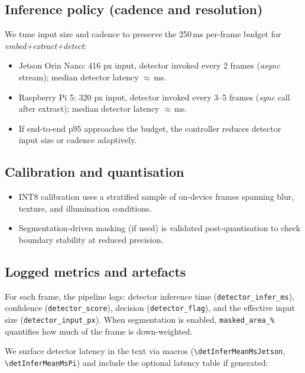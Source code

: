 \subsection{Inference policy (cadence and resolution)}
\label{sec:validation:yolov8n-policy}
We tune input size and cadence to preserve the 250\,ms per-frame budget for \emph{embed+extract+detect}:
\begin{itemize}
  \item Jetson Orin Nano: \(416\) px input, detector invoked every 2 frames (\emph{async} stream); median detector latency \(\approx\)\detInferMeanMsJetson\,ms.
  \item Raspberry Pi 5: \(320\) px input, detector invoked every 3–5 frames (\emph{sync} call after extract); median detector latency \(\approx\)\detInferMeanMsPi\,ms.
  \item If end-to-end p95 approaches the budget, the controller reduces detector input size or cadence adaptively.
\end{itemize}

\subsection{Calibration and quantisation}
\label{sec:validation:yolov8n-quant}
\begin{itemize}
  \item INT8 calibration uses a stratified sample of on-device frames spanning blur, texture, and illumination conditions.
  \item Segmentation-driven masking (if used) is validated post-quantisation to check boundary stability at reduced precision.
\end{itemize}

\subsection{Logged metrics and artefacts}
\label{sec:validation:yolov8n-metrics}
For each frame, the pipeline logs: detector inference time (\texttt{detector\_infer\_ms}), confidence (\texttt{detector\_score}), decision (\texttt{detector\_flag}), and the effective input size (\texttt{detector\_input\_px}). When segmentation is enabled, \texttt{masked\_area\_\%} quantifies how much of the frame is down-weighted.

We surface detector latency in the text via macros (\verb+\detInferMeanMsJetson+, \verb+\detInferMeanMsPi+) and include the optional latency table if generated:

